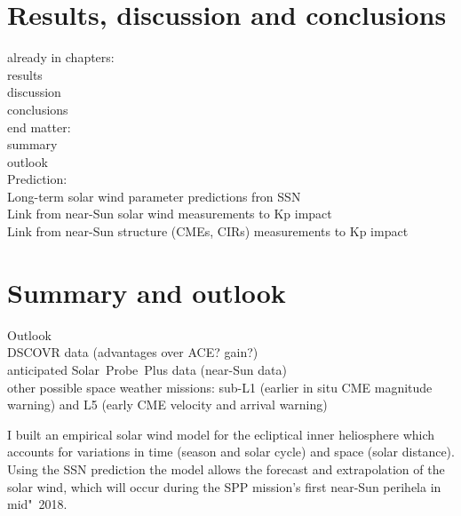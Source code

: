 \chapter[Results+conclusions]{Results, discussion and conclusions}


already in chapters:\\
results\\
discussion\\
conclusions\\

end matter:\\
summary\\
outlook\\

Prediction:\\
Long-term solar wind parameter predictions fron SSN\\
Link from near-Sun solar wind measurements to Kp impact\\
Link from near-Sun structure (CMEs, CIRs) measurements to Kp impact\\


\chapter{Summary and outlook}


Outlook\\
DSCOVR data (advantages over ACE? gain?)\\
anticipated Solar~Probe~Plus data (near-Sun data)\\

other possible space weather missions: sub-L1 (earlier in situ CME magnitude warning) and L5 (early CME velocity and arrival warning)


I built an empirical solar wind model for the ecliptical inner heliosphere which accounts for variations in time (season and solar cycle) and space (solar distance).\\

Using the SSN prediction the model allows the forecast and extrapolation of the solar wind, which will occur during the SPP mission's first near-Sun perihela in mid"~2018.\\



